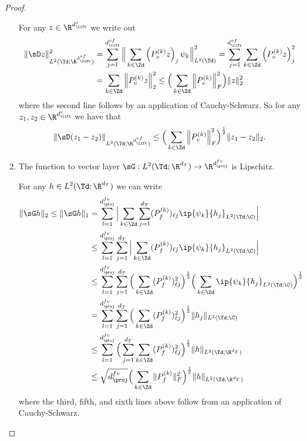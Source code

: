 \documentclass[letterpaper,11pt]{article}
\begin{document}
\begin{proof}
\begin{enumerate}[label=(\roman*)]
    For any $z \in \R^{d_{\lift}^v}$ we write out
    \begin{align*}
        \|\sD z\|_{L^2(\Td; \R^{d_{\lift}^{vf}})}^2 &= \sum_{j=1}^{d_{\lift}^{vf}}\Big\|\sum_{k \in \Zd} \left(P_v^{(k)}z\right)_j \psi_k\Big\|_{L^2(\Td)}^2 = \sum_{j=1}^{d_{\lift}^{vf}}\sum_{k \in \Zd}\left(P_v^{(k)}z\right)_j^2\\
        &= \sum_{k \in \Zd}\Big\|P_v^{(k)}z\Big\|_2^2 \leq \Big(\sum_{k \in \Zd}\Big\|P_v^{(k)}\Big\|_F^2\Big)\|z\|_2^2
    \end{align*}
    where the second line follows by an application of Cauchy-Schwarz. So for any $z_1, z_2 \in \R^{d_{\lift}^v}$ we have that
    \begin{equation}
        \|\sD(z_1 - z_2)\|_{L^2(\Td; \R^{d_{\lift}^{vf}})} \leq \Big(\sum_{k \in \Zd}\Big\|P_v^{(k)}\Big\|_F^2\Big)^\frac{1}{2}\|z_1 - z_2\|_2.
    \end{equation}

    \item The function to vector layer $\sG: L^2(\Td; \R^{d_T}) \to \R^{d_{\proj}^{fv}}$ is Lipschitz.

    For any $h \in L^2(\Td; \R^{d_T})$ we can write
    \begin{align*}
        \|\sG h\|_2 \leq \|\sG h\|_1 &= \sum_{l=1}^{d_{\proj}^{fv}}\Big|\sum_{k \in \Zd}\sum_{j=1}^{d_T} (P^{(k)}_f)_{\ell j} \ip{\psi_k}{h_j}_{L^2(\Td;\C)}\Big|\\
        &\leq \sum_{l=1}^{d_{\proj}^{fv}}\sum_{j=1}^{d_T} \Big|\sum_{k \in \Zd}(P^{(k)}_f)_{\ell j} \ip{\psi_k}{h_j}_{L^2(\Td;\C)}\Big|\\
        &\leq \sum_{l=1}^{d_{\proj}^{fv}}\sum_{j=1}^{d_T} \Big(\sum_{k \in \Zd}(P^{(k)}_f)_{\ell j}^2\Big)^\frac{1}{2} \Big(\sum_{k \in \Zd}\ip{\psi_k}{h_j}_{L^2(\Td;\C)}\Big)^\frac{1}{2}\\
        &= \sum_{l=1}^{d_{\proj}^{fv}}\sum_{j=1}^{d_T} \Big(\sum_{k \in \Zd}(P^{(k)}_f)_{\ell j}^2\Big)^\frac{1}{2}\|h_j\|_{L^2(\Td;\C)}\\
        &\leq \sum_{l=1}^{d_{\proj}^{fv}}\Big(\sum_{j=1}^{d_T} \sum_{k \in \Zd}(P^{(k)}_f)_{\ell j}^2\Big)^\frac{1}{2}\|h\|_{L^2(\Td;\R^{d_T})}\\
        &\leq \sqrt{d_{\proj}^{fv}}\Big(\sum_{k \in \Zd}\|P^{(k)}_f\|_F^2\Big)^\frac{1}{2}\|h\|_{L^2(\Td;\R^{d_T})}
    \end{align*}
    where the third, fifth, and sixth lines above follow from an application of Cauchy-Schwarz.
\end{enumerate}
\end{proof}
\end{document}
